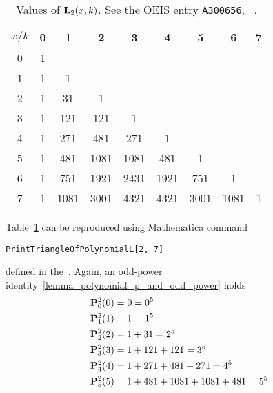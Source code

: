 \begin{table}[H]
    \setlength\extrarowheight{-6pt}
    \begin{tabular}{c|cccccccc}
        $x/k$ & 0 & 1    & 2    & 3    & 4    & 5    & 6    & 7 \\
        \hline
        0     & 1 &      &      &      &      &      &      &   \\
        1     & 1 & 1    &      &      &      &      &      &   \\
        2     & 1 & 31   & 1    &      &      &      &      &   \\
        3     & 1 & 121  & 121  & 1    &      &      &      &   \\
        4     & 1 & 271  & 481  & 271  & 1    &      &      &   \\
        5     & 1 & 481  & 1081 & 1081 & 481  & 1    &      &   \\
        6     & 1 & 751  & 1921 & 2431 & 1921 & 751  & 1    &   \\
        7     & 1 & 1081 & 3001 & 4321 & 4321 & 3001 & 1081 & 1
    \end{tabular}
    \caption{Values of ${\mathbf{L}}\sb{2}(x,k)$.
    See the OEIS entry \href{https://oeis.org/A300656}{\texttt{A300656}}, ~\cite{kolosov2018fifth}.}
    \label{tab:tab_4}
\end{table}
Table~\ref{tab:tab_4} can be reproduced using Mathematica command
\begin{center}
    \texttt{PrintTriangleOfPolynomialL[2, 7]}
\end{center}
defined in the~\cite{github_source_files}.
Again, an odd-power identity~\ref{lemma_polynomial_p_and_odd_power} holds
\begin{equation*}
    \begin{split}
        {\mathbf{P}}\sp{2} \sb{0}(0) &= 0 = 0^5 \\
        {\mathbf{P}}\sp{2} \sb{1}(1) &= 1 = 1^5 \\
        {\mathbf{P}}\sp{2} \sb{2}(2) &= 1+31 = 2^5 \\
        {\mathbf{P}}\sp{2} \sb{3}(3) &= 1+121+121 = 3^5 \\
        {\mathbf{P}}\sp{2} \sb{4}(4) &= 1+271+481+271 = 4^5 \\
        {\mathbf{P}}\sp{2} \sb{5}(5) &= 1+481+1081+1081+481 = 5^5
    \end{split}
\end{equation*}
